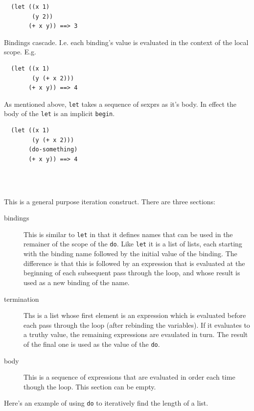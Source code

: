 \documentclass[12pt]{article}
\begin{document}
\begin{verbatim}
  (let ((x 1)
        (y 2))
       (+ x y)) ==> 3
\end{verbatim}

Bindings cascade. I.e. each binding's value is evaluated in the
context of the local scope. E.g.

\begin{verbatim}
  (let ((x 1)
        (y (+ x 2)))
       (+ x y)) ==> 4
\end{verbatim}

As mentioned above, \verb|let| takes a sequence of sexprs as it's
body. In effect the body of the \verb|let| is an implicit
\verb|begin|.

\begin{verbatim}
  (let ((x 1)
        (y (+ x 2)))
       (do-something)
       (+ x y)) ==> 4
\end{verbatim}

\\
\\

This is a general purpose iteration construct. There are three
sections:

\begin{description}
\item[bindings] This is similar to \verb|let| in that it defines names
  that can be used in the remainer of the scope of the \verb|do|. Like
  \verb|let| it is a list of lists, each starting with the binding
  name followed by the initial value of the binding. The difference is
  that this is followed by an expression that is evaluated at the
  beginning of each subsequent pass through the loop, and whose result
  is used as a new binding of the name.
\item[termination] Ths is a list whose first element is an expression
  which is evaluated before each pass through the loop (after
  rebinding the variables). If it evaluates to a truthy value, the
  remaining expressions are evaulated in turn. The result of the final
  one is used as the value of the \verb|do|.
\item[body] This is a sequence of expressions that are evaluated in
  order each time though the loop. This section can be empty.
\end{description}

Here's an example of using \verb|do| to iteratively find the length of a
list.
\end{document}
